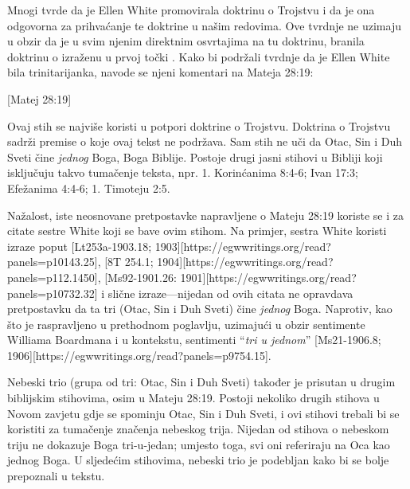 
Mnogi tvrde da je Ellen White promovirala doktrinu o Trojstvu i da je ona odgovorna za prihvaćanje te doktrine u našim redovima. Ove tvrdnje ne uzimaju u obzir da je u svim njenim direktnim osvrtajima na tu doktrinu, branila  doktrinu o  izraženu u prvoj točki . Kako bi podržali tvrdnje da je Ellen White bila trinitarijanka, navode se njeni komentari na Mateja 28:19:

[Matej 28:19]

Ovaj stih se najviše koristi u potpori doktrine o Trojstvu. Doktrina o Trojstvu sadrži premise o  koje ovaj tekst ne podržava. Sam stih ne uči da Otac, Sin i Duh Sveti čine \textit{jednog} Boga, Boga Biblije. Postoje drugi jasni stihovi u Bibliji koji isključuju takvo tumačenje teksta, npr. 1. Korinćanima 8:4-6; Ivan 17:3; Efežanima 4:4-6; 1. Timoteju 2:5.

Nažalost, iste neosnovane pretpostavke napravljene o Mateju 28:19 koriste se i za citate sestre White koji se bave ovim stihom. Na primjer, sestra White koristi izraze poput [Lt253a-1903.18; 1903][https://egwwritings.org/read?panels=p10143.25], [8T 254.1; 1904][https://egwwritings.org/read?panels=p112.1450], [Ms92-1901.26: 1901][https://egwwritings.org/read?panels=p10732.32] i slične izraze—nijedan od ovih citata ne opravdava pretpostavku da ta tri (Otac, Sin i Duh Sveti) čine \textit{jednog} Boga. Naprotiv, kao što je raspravljeno u prethodnom poglavlju, uzimajući u obzir sentimente Williama Boardmana i  u kontekstu, sentimenti “\textit{tri u jednom}” [Ms21-1906.8; 1906][https://egwwritings.org/read?panels=p9754.15].

Nebeski trio (grupa od tri: Otac, Sin i Duh Sveti) također je prisutan u drugim biblijskim stihovima, osim u Mateju 28:19. Postoji nekoliko drugih stihova u Novom zavjetu gdje se spominju Otac, Sin i Duh Sveti, i ovi stihovi trebali bi se koristiti za tumačenje značenja nebeskog trija. Nijedan od stihova o nebeskom triju ne dokazuje Boga tri-u-jedan; umjesto toga, svi oni referiraju na Oca kao jednog Boga. U sljedećim stihovima, nebeski trio je podebljan kako bi se bolje prepoznali u tekstu.

